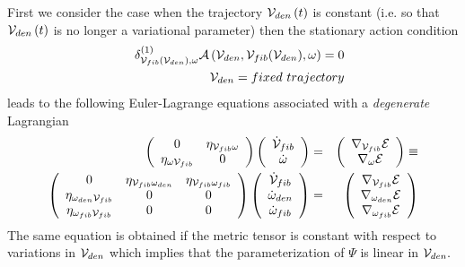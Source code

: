 First we consider the case when the trajectory ${\cal V}_{den}\left(
t\right) $ is constant (i.e. so that ${\cal V}_{den}\left( t\right) $ is no
longer a variational parameter) then the stationary action condition 
\begin{eqnarray}
&&\delta _{{\cal V}_{fib}({\cal V}_{den}),\omega }^{\left( 1\right) }{\cal A}%
\left( {\cal V}_{den},{\cal V}_{fib}({\cal V}_{den}),\omega \right) =0 
\nonumber \\
&&{\cal V}_{den}=fixed\,\,trajectory
\end{eqnarray}%
leads to the following Euler-Lagrange equations associated with a {\em %
degenerate }Lagrangian 
\begin{eqnarray}
\left( 
\begin{array}{cc}
0 & \eta _{{\cal V}_{fib}\omega } \\ 
\eta _{\omega {\cal V}_{fib}} & 0%
\end{array}%
\right) \left( 
\begin{array}{c}
{\cal \dot{V}}_{fib} \\ 
\dot{\omega}%
\end{array}%
\right) &=&\left( 
\begin{array}{c}
\nabla _{{\cal V}_{fib}}{\cal E} \\ 
\nabla _{\omega }{\cal E}%
\end{array}%
\right) \equiv  \nonumber \\
\left( 
\begin{array}{ccc}
0 & \eta _{{\cal V}_{fib}\omega _{den}} & \eta _{{\cal V}_{fib}\omega _{fib}}
\\ 
\eta _{\omega _{den}{\cal V}_{fib}} & 0 & 0 \\ 
\eta _{\omega _{fib}{\cal V}_{fib}} & 0 & 0%
\end{array}%
\right) \left( 
\begin{array}{c}
{\cal \dot{V}}_{fib} \\ 
\dot{\omega}_{den} \\ 
\dot{\omega}_{fib}%
\end{array}%
\right) &=&\left( 
\begin{array}{c}
\nabla _{{\cal V}_{fib}}{\cal E} \\ 
\nabla _{\omega _{den}}{\cal E} \\ 
\nabla _{\omega _{fib}}{\cal E}%
\end{array}%
\right)
\end{eqnarray}%
The same equation is obtained if the metric tensor is constant with respect
to variations in ${\cal V}_{den}$ which implies that the parameterization of 
$\Psi $ is linear in ${\cal V}_{den}.$

